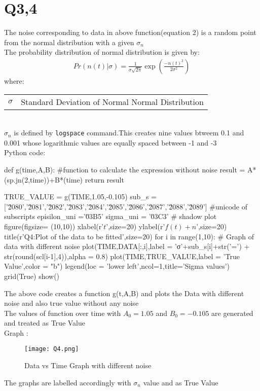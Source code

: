 \documentclass[12pt, a4paper]{report}
\makeatletter
\newenvironment{conditions}[1][where:]
  {#1 \begin{tabular}[t]{>{$}l<{$} @{${}={}$} l}}
  {\end{tabular}\\[\belowdisplayskip]}
\makeatother
\begin{document}
 \section*{Q3,4}
 The noise corresponding to data in above function(equation 2) is a random point from the normal distribution with a given $\sigma_n$\\ 
The probability distribution of normal distribution is given by:
\begin{align}
  Pr(n(t)|\sigma)=\frac{1}{\sigma\sqrt{2\pi}}\exp\left({\frac{-n(t)^2}{2\sigma^2}}\right)
\end{align}
\begin{conditions}
\sigma & Standard Deviation of Normal Normal Distribution 
\end{conditions}
$\sigma_n$ is defined by \texttt{logspace} command.This creates nine values btweem 0.1 and 0.001 whose logarithmic values are equally spaced between -1 and -3\\ 
 Python code:
\begin{py_code}
def g(time,A,B):                            #function to calculate the expression without noise
    result = A*(sp.jn(2,time))+B*(time)
    return result

TRUE_VALUE = g(TIME,1.05,-0.105)
sub_s = ['\u2080','\u2081','\u2082','\u2083','\u2084','\u2085','\u2086','\u2087','\u2088','\u2089'] #unicode of subscripts
episilon_uni  ='\u03B5'
sigma_uni = '\u03C3'
# shadow plot
figure(figsize= (10,10))
xlabel(r'$t$',size=20)
ylabel(r'$f(t)+n$',size=20)
title(r'Q4:Plot of the data to be fitted',size=20)
for i in range(1,10):          # Graph of data with different noise
    plot(TIME,DATA[:,i],label = 'σ'+sub_s[i]+str('=') + str(round(scl[i-1],4)),alpha = 0.8)
plot(TIME,TRUE_VALUE,label = 'True Value',color = "b")
legend(loc = 'lower left',ncol=1,title='Sigma values')
grid(True)
show()
\end{py_code}
The above code creates a function g(t,A,B) and plots the Data with different noise and also true value without any noise \\
The values of function over time with $ A_0 = 1.05$ and $ B_0 = -0.105$ are generated and treated as True Value \\
Graph :
 \begin{figure}[H]
	\centering
	\texttt{[image: Q4.png]}  %
	\caption{Data vs Time Graph with different noise}
	\label{fig:Q4 }
\end{figure} 
The graphs are labelled accordingly with $\sigma_n$ value and as True Value\\
\end{document}

